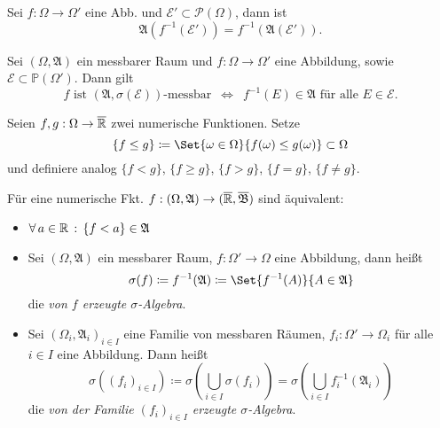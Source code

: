 \documentclass{cheat-sheet}
\newcommand{\Alg}{\mathfrak{A}} %
\renewcommand{\P}{\mathbb{P}} %
\newcommand{\Bor}{\mathfrak{B}} %
\begin{document}
\begin{lem}
  Sei $f : \Omega \to \Omega'$ eine Abb. und $\mathcal{E}' \subset \mathcal{P}(\Omega)$, dann ist
  \[ \Alg(f^{-1}(\mathcal{E}')) = f^{-1}(\Alg(\mathcal{E}')). \]
\end{lem}

\begin{lem}
  Sei $(\Omega, \Alg)$ ein messbarer Raum und $f : \Omega \to \Omega'$ eine Abbildung, sowie $\mathcal{E} \subset \P(\Omega')$. Dann gilt
  \[ f \text{ ist $(\Alg, \sigma(\mathcal{E}))$-messbar} \enspace \iff \enspace f^{-1}(E) \in \Alg \text{ für alle } E \in \mathcal{E}. \]
\end{lem}

\begin{nota}
  Seien $f, g : \Omega \to \overline{\mathbb{R}}$ zwei numerische Funktionen. Setze
    \[ \{ f \leq g \} \coloneqq \Set{ \omega \in \Omega }{ f(\omega) \leq g(\omega) } \subset \Omega \]
  und definiere analog $\{ f < g \}$, $\{ f \geq g \}$, $\{ f > g \}$, $\{ f = g \}$, $\{ f \not= g \}$.
\end{nota}

\begin{satz}
  Für eine numerische Fkt. $f : (\Omega, \Alg) \to (\ER, \overline{\Bor})$ sind äquivalent:
  \begin{itemize}
    \miniitem{0.7 \linewidth}{$\forall \, a \in \R \,:\, \{ f \geq a \} = f^{-1}([a, \infty]) \in \Alg$}
    \item $\fa{a \in \R} \{ f < a \} \in \Alg$
  \end{itemize}
\end{satz}

\begin{defn}
  \begin{itemize}
    \item Sei $(\Omega, \Alg)$ ein messbarer Raum, $f : \Omega' \to \Omega$ eine Abbildung, dann heißt
    \[ \sigma(f) \coloneqq f^{-1}(\Alg) \coloneqq \Set{ f^{-1}(A) }{ A \in \Alg } \]
    die \emph{von $f$ erzeugte $\sigma$-Algebra}.
    \item Sei $(\Omega_i, \Alg_i)_{i \in I}$ eine Familie von messbaren Räumen, $f_i : \Omega' \to \Omega_i$ für alle $i \in I$ eine Abbildung. Dann heißt
    \[ \sigma((f_i)_{i \in I}) \coloneqq \sigma(\bigcup_{i \in I} \sigma(f_i)) = \sigma(\bigcup_{i \in I} f_i^{-1}(\Alg_i)) \]
    die \emph{von der Familie $(f_i)_{i \in I}$ erzeugte $\sigma$-Algebra}.
  \end{itemize}
\end{defn}
\end{document}
